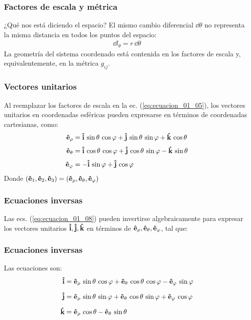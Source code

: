 \documentclass[12pt]{beamer}
\begin{document}
\begin{frame}
\frametitle{Factores de escala y métrica}
\begin{alertblock}{¿Qué nos está diciendo el espacio?}
El mismo cambio diferencial $\dd{\theta}$ no representa la misma distancia en todos los puntos del espacio:
\begin{align*}
   \dd{l_{\theta}} = r \, \dd{\theta}
\end{align*}
\pause
La geometría del sistema coordenado está contenida en los factores de escala y, equivalentemente, en la métrica $g_{ij}$.
\end{alertblock}
\end{frame}
\begin{frame}
\frametitle{Vectores unitarios}
Al reemplazar los factores de escala en la ec. (\ref{eq:ecuacion_01_05}), los vectores unitarios en coordenadas esféricas pueden expresarse en términos de coordenadas cartesianas, como:
\pause
\begin{align}
\begin{aligned}
\vu{e}_{\rho} &= \vu{i} \, \sin \theta \, \cos \varphi + \vu{j} \, \sin \theta \, \sin \varphi + \vu{k} \, \cos \theta \\[0.25em]
\vu{e}_{\theta} &= \vu{i} \, \cos \theta \, \cos \varphi + \vu{j} \, \cos \theta \, \sin \varphi - \vu{k} \, \sin \theta \\[0.25em]
\vu{e}_{\varphi} &= - \vu{i} \, \sin \varphi + \vu{j} \, \cos \varphi
\end{aligned}
\label{eq:ecuacion_01_08}
\end{align}
Donde $(\vu{e}_{1}, \vu{e}_{2}, \vu{e}_{3}) = (\vu{e}_{\rho}, \vu{e}_{\theta}, \vu{e}_{\varphi})$
\end{frame}
\begin{frame}
\frametitle{Ecuaciones inversas}
Las ecs. (\ref{eq:ecuacion_01_08}) pueden invertirse algebraicamente para expresar los vectores unitarios $\vu{i}, \vu{j}, \vu{k}$ en términos de $\vu{e}_{\rho}, \vu{e}_{\theta}, \vu{e}_{\varphi}$, tal que:
\end{frame}
\begin{frame}
\frametitle{Ecuaciones inversas}
Las ecuaciones son:
\pause
\begin{align*}
\vu{i} &= \vu{e}_{\rho} \, \sin \theta \, \cos \varphi + \vu{e}_{\theta} \, \cos \theta \, \cos \varphi - \vu{e}_{\varphi} \, \sin \varphi \\[0.5em]
\vu{j} &= \vu{e}_{\rho} \, \sin \theta \, \sin \varphi + \vu{e}_{\theta} \, \cos \theta \, \sin \varphi + \vu{e}_{\varphi} \, \cos \varphi \\[0.5em]
\vu{k} &= \vu{e}_{\rho} \, \cos \theta - \vu{e}_{\theta} \, \sin \theta
\end{align*}
\end{frame}
\end{document}
